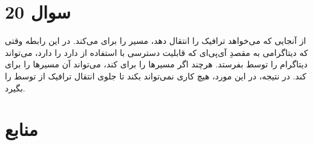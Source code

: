 \documentclass{article}
\begin{document}
\section{سوال 20}
از آنجایی که  می‌خواهد ترافیک  را انتقال دهد، مسیر را برای   می‌کند. در این رابطه وقتی که  دیتاگرامی به مقصدِ آی‌پی‌ای که قابلیت دسترسی با استفاده از  دارد را دارد،  می‌تواند دیتاگرام را توسط  بفرستد. هرچند اگر  مسیرها را برای   کند،  می‌تواند آن مسیرها را برای   کند. در نتیجه، در این مورد،  هیچ کاری نمی‌تواند بکند تا جلوی انتقال ترافیک از  توسط  را بگیرد.


\section*{منابع}
\renewcommand{\section}[2]{}%
\begin{thebibliography}{99} %


\begin{LTRitems}

\resetlatinfont

\end{LTRitems}

\end{thebibliography}
\end{document}
